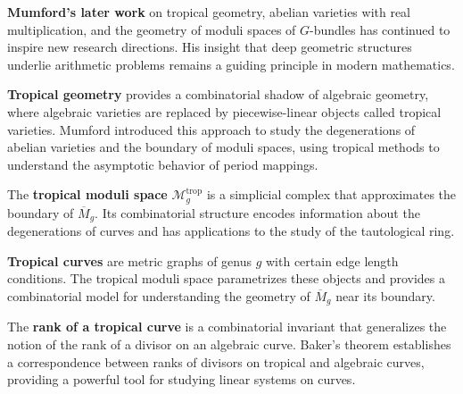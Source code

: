 \textbf{Mumford's later work} on tropical geometry, abelian varieties with real multiplication, and the geometry of moduli spaces of $G$-bundles has continued to inspire new research directions. His insight that deep geometric structures underlie arithmetic problems remains a guiding principle in modern mathematics.

\textbf{Tropical geometry} provides a combinatorial shadow of algebraic geometry, where algebraic varieties are replaced by piecewise-linear objects called tropical varieties. Mumford introduced this approach to study the degenerations of abelian varieties and the boundary of moduli spaces, using tropical methods to understand the asymptotic behavior of period mappings.

The \textbf{tropical moduli space} $\mathcal{M}_g^{\text{trop}}$ is a simplicial complex that approximates the boundary of $\overline{M}_g$. Its combinatorial structure encodes information about the degenerations of curves and has applications to the study of the tautological ring.

\textbf{Tropical curves} are metric graphs of genus $g$ with certain edge length conditions. The tropical moduli space parametrizes these objects and provides a combinatorial model for understanding the geometry of $\overline{M}_g$ near its boundary.

The \textbf{rank of a tropical curve} is a combinatorial invariant that generalizes the notion of the rank of a divisor on an algebraic curve. Baker's theorem establishes a correspondence between ranks of divisors on tropical and algebraic curves, providing a powerful tool for studying linear systems on curves.
